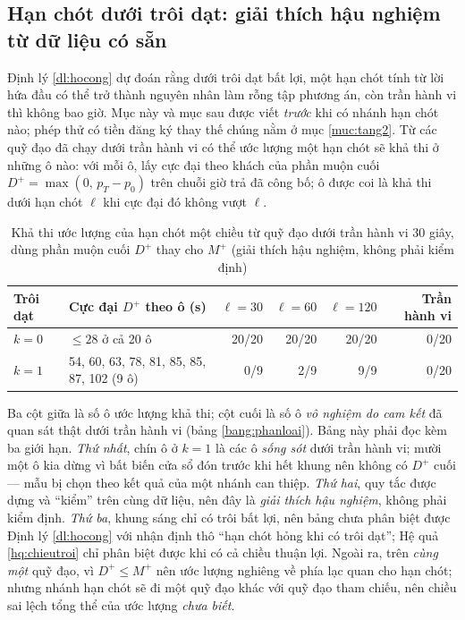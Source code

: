 \subsection{Hạn chót dưới trôi dạt: giải thích hậu nghiệm từ dữ liệu có sẵn}
\label{muc:haunghiem}

Định lý \ref{dl:hocong} dự đoán rằng dưới trôi dạt bất lợi, một hạn chót tính từ lời hứa đầu có
thể trở thành nguyên nhân làm rỗng tập phương án, còn trần hành vi thì không bao giờ. Mục này và
mục sau được viết \emph{trước} khi có nhánh hạn chót nào; phép thử có tiền đăng ký thay thế chúng
nằm ở mục \ref{muc:tang2}. Từ các quỹ đạo đã chạy dưới trần hành vi có thể ước
lượng một hạn chót sẽ khả thi ở những ô nào: với mỗi ô, lấy cực đại theo khách của phần muộn cuối
$D^{+} = \max(0,\, p_T - p_0)$ trên chuỗi giờ trả đã công bố; ô được coi là khả thi dưới hạn chót
$\ell$ khi cực đại đó không vượt $\ell$.

\begin{table}[htbp]
\centering
\caption{Khả thi ước lượng của hạn chót một chiều từ quỹ đạo dưới trần hành vi 30 giây, dùng phần
muộn cuối $D^{+}$ thay cho $M^{+}$ (giải thích hậu nghiệm, không phải kiểm định)}
\label{bang:haunghiem}
\small
\begin{tabular}{@{}lp{4.2cm}rrrr@{}}
\toprule
\textbf{Trôi dạt} & \textbf{Cực đại $D^{+}$ theo ô (s)} & $\ell = 30$ & $\ell = 60$ & $\ell = 120$
& \textbf{Trần hành vi}\\
\midrule
$k = 0$ & $\le 28$ ở cả 20 ô & 20/20 & 20/20 & 20/20 & 0/20\\
$k = 1$ & 54, 60, 63, 78, 81, 85, 85, 87, 102 (9 ô) & 0/9 & 2/9 & 9/9 & 0/20\\
\bottomrule
\end{tabular}
\end{table}

Ba cột giữa là số ô ước lượng khả thi; cột cuối là số ô \emph{vô nghiệm do cam kết} đã quan sát
thật dưới trần hành vi (bảng \ref{bang:phanloai}). Bảng này phải đọc kèm ba giới hạn.
\emph{Thứ nhất}, chín ô ở $k = 1$ là các ô \emph{sống sót} dưới trần hành vi; mười một ô kia dừng
vì bất biến cửa sổ đón trước khi hết khung nên không có $D^{+}$ cuối --- mẫu bị chọn theo kết quả
của một nhánh can thiệp. \emph{Thứ hai}, quy tắc được dựng và ``kiểm'' trên cùng dữ liệu, nên đây là
\emph{giải thích hậu nghiệm}, không phải kiểm định. \emph{Thứ ba}, khung sáng chỉ có trôi bất lợi,
nên bảng chưa phân biệt được Định lý \ref{dl:hocong} với nhận định thô ``hạn chót hỏng khi có trôi
dạt''; Hệ quả \ref{hq:chieutroi} chỉ phân biệt được khi có cả chiều thuận lợi. Ngoài ra, trên
\emph{cùng một} quỹ đạo, vì $D^{+} \le M^{+}$ nên ước lượng nghiêng về phía lạc quan cho hạn chót;
nhưng nhánh hạn chót sẽ đi một quỹ đạo khác với quỹ đạo tham chiếu, nên chiều sai lệch tổng thể
của ước lượng \emph{chưa biết}.

